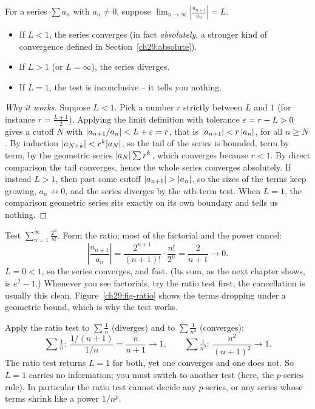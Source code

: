 \begin{theorem}
\label{ch29:thm-ratio}
For a series $\sum a_n$ with $a_n \neq 0$, suppose $\displaystyle\lim_{n\to\infty}\left|\frac{a_{n+1}}{a_n}\right| = L$.
\begin{itemize}
\item If $L < 1$, the series converges (in fact \emph{absolutely}, a stronger kind of convergence defined in Section~\ref{ch29:absolute}).
\item If $L > 1$ (or $L=\infty$), the series diverges.
\item If $L = 1$, the test is inconclusive -- it tells you nothing.
\end{itemize}
\end{theorem}

\begin{proof}[Why it works]
Suppose $L<1$. Pick a number $r$ strictly between $L$ and $1$ (for instance $r = \frac{L+1}{2}$). Applying the limit definition with tolerance $\varepsilon = r - L > 0$ gives a cutoff $N$ with $\lvert a_{n+1}/a_n\rvert < L + \varepsilon = r$, that is $\lvert a_{n+1}\rvert < r\,\lvert a_n\rvert$, for all $n \ge N$. By induction $\lvert a_{N+k}\rvert < r^k \lvert a_N\rvert$, so the tail of the series is bounded, term by term, by the geometric series $\lvert a_N\rvert\sum r^k$, which converges because $r<1$. By direct comparison the tail converges, hence the whole series converges absolutely. If instead $L>1$, then past some cutoff $\lvert a_{n+1}\rvert > \lvert a_n\rvert$, so the sizes of the terms keep growing, $a_n \not\to 0$, and the series diverges by the $n$th-term test. When $L=1$, the comparison geometric series sits exactly on its own boundary and tells us nothing.
\end{proof}

\begin{example}
Test $\displaystyle\sum_{n=1}^\infty \frac{2^n}{n!}$. Form the ratio; most of the factorial and the power cancel:
\[
\left|\frac{a_{n+1}}{a_n}\right| = \frac{2^{n+1}}{(n+1)!}\cdot\frac{n!}{2^n} = \frac{2}{n+1} \longrightarrow 0.
\]
$L = 0 < 1$, so the series converges, and fast. (Its sum, as the next chapter shows, is $e^2 - 1$.) Whenever you see factorials, try the ratio test first; the cancellation is usually this clean. Figure~\ref{ch29:fig-ratio} shows the terms dropping under a geometric bound, which is why the test works.
\end{example}

\begin{example}[Why $L=1$ tells you nothing]
Apply the ratio test to $\sum \tfrac1n$ (diverges) and to $\sum \tfrac1{n^2}$ (converges):
\[
\sum\tfrac1n:\ \frac{1/(n+1)}{1/n}=\frac{n}{n+1}\to 1, \qquad
\sum\tfrac1{n^2}:\ \frac{n^2}{(n+1)^2}\to 1.
\]
The ratio test returns $L=1$ for both, yet one converges and one does not. So $L=1$ carries no information; you must switch to another test (here, the $p$-series rule). In particular the ratio test cannot decide any $p$-series, or any series whose terms shrink like a power $1/n^p$.
\end{example}

